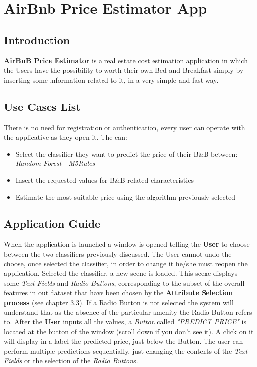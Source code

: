 \section{AirBnb Price Estimator App}

\subsection{Introduction}
\textbf{AirBnB Price Estimator} is a real estate cost estimation application in which the Users have the possibility to worth their own Bed and Breakfast simply by inserting some information related to it, in a very simple and fast way.

\subsection{Use Cases List}
There is no need for registration or authentication, every user can operate with the applicative as they open it.
The can:
\begin{itemize}
	\item Select the classifier they want to predict the price of their B\&B between:
		\subitem - \textit{Random Forest}
		\subitem - \textit{M5Rules}
	\item Insert the requested values for B\&B related characteristics
	\item Estimate the most suitable price using the algorithm previously selected
\end{itemize}

\subsection{Application Guide}
When the application is launched a window is opened telling the \textbf{User} to choose between the two classifiers previously discussed. The User cannot undo the choose, once selected the classifier, in order to change it he/she must reopen the application.
Selected the classifier, a new scene is loaded. This scene displays some \textit{Text Fields} and
\textit{Radio Buttons}, corresponding to the subset of the overall features in out dataset that have been chosen by the \textbf{Attribute Selection process} (see chapter 3.3).
If a Radio Button is not selected the system will understand that as the absence of the particular amenity the Radio Button refers to.
After the \textbf{User} inputs all the values, a \textit{Button} called \textit{"PREDICT PRICE"} is located at
the button of the window (scroll down if you don't see it). A click on it will display in a label the predicted price, just below the Button.
The user can perform multiple predictions sequentially, just changing the contents of the \textit{Text Fields} or the selection of the \textit{Radio Button}s.

